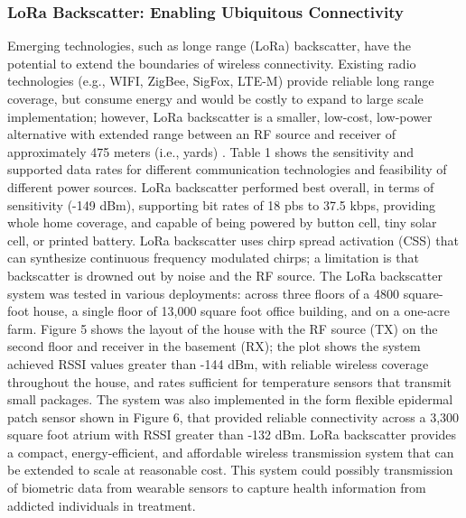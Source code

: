 \documentclass[sigconf]{acmart}
\begin{document}
\subsubsection{LoRa Backscatter: Enabling Ubiquitous Connectivity} 

Emerging technologies, such as longe range (LoRa) backscatter, have the potential 
to extend the boundaries of wireless connectivity. Existing radio technologies 
(e.g., WIFI, ZigBee, SigFox, LTE-M) provide reliable long range coverage, but 
consume energy and would be costly to expand to large scale implementation; 
however, LoRa backscatter is a smaller, low-cost, low-power alternative with 
extended range between an RF source and receiver of approximately 475 meters 
(i.e., yards) \cite{talla17}. Table 1 shows the sensitivity and supported data 
rates for different communication technologies and  feasibility of different 
power sources. LoRa backscatter performed best overall, in terms of sensitivity 
(-149 dBm), supporting bit rates of 18 pbs to 37.5 kbps, providing whole home 
coverage, and capable of being powered by button cell, tiny solar cell, or 
printed battery. LoRa backscatter uses chirp spread activation (CSS) that can 
synthesize continuous frequency modulated chirps; a limitation is that 
backscatter is drowned out by noise and the RF source. The LoRa backscatter 
system was tested in various deployments: across three floors of a 4800 square-
foot house, a single floor of 13,000 square foot office building, and on a 
one-acre farm. Figure 5 shows the layout of the house with the RF source (TX) 
on the second floor and receiver in the basement (RX); the plot shows the system 
achieved RSSI values greater than -144 dBm, with reliable wireless coverage 
throughout the house, and rates sufficient for temperature sensors that 
transmit small packages. The system was also implemented in the form flexible 
epidermal patch sensor shown in Figure 6, that provided reliable connectivity 
across a 3,300 square foot atrium with RSSI greater than -132 dBm. LoRa 
backscatter provides a compact, energy-efficient, and affordable wireless 
transmission system that can be extended to scale at reasonable cost. This 
system could possibly transmission of biometric data from wearable sensors 
to capture health information from addicted individuals in treatment. 
\end{document}
